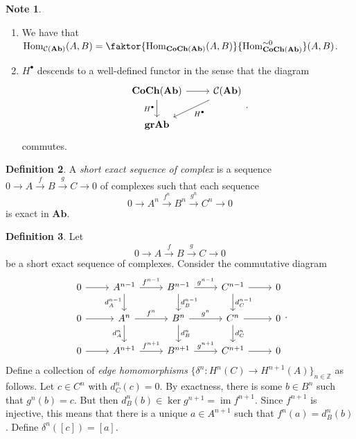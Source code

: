 \documentclass[10pt,letterpaper,cm]{nupset}
\theoremstyle{definition}
\newtheorem{definition}{Definition}[subsection]
\newtheorem{note}[definition]{Note}
\theoremstyle{theorem}
\theoremstyle{remark}
\newcommand{\Z}{\mathbb Z}
\newcommand{\1}{\mathbf{1}}
\newcommand{\0}{\vec 0}
\DeclareMathOperator{\im}{im}
\DeclareMathOperator{\Hom}{Hom}
\begin{document}
\begin{note} $ $
\begin{enumerate}
\item We have that $\Hom_{\mathcal{C}(\mathbf{Ab})}(A, B) = \faktor{\Hom_{\mathbf{CoCh(Ab)}}(A, B)}{\Hom_{\mathbf{CoCh(Ab)}}^{\sim 0}}(A, B)$.
\item $H^{\bullet}$ descends to a well-defined functor in the sense that the diagram
\[
\begin{tikzcd}
 \mathbf{CoCh(Ab)} \arrow[d, "H^{\bullet}"'] \arrow[r] &  \mathcal{C}(\mathbf{Ab}) \arrow[ld, "H^{\bullet}"] \\
\mathbf{grAb}                                          &                                  
\end{tikzcd}
. \]
commutes.
\end{enumerate}
\end{note}

\begin{definition}
A \textit{short exact sequence of complex} is a sequence $0 \to A \overset{f}{\longrightarrow} B \overset{g}{\longrightarrow} C \to 0$ of complexes such that each sequence $$0 \to A^n \overset{f^n}{\longrightarrow} B^n \overset{g^n}{\longrightarrow} C^n \to 0$$ is exact in $\mathbf{Ab}$.
\end{definition}

\begin{definition}
Let $$0 \to A \overset{f}{\longrightarrow} B \overset{g}{\longrightarrow} C \to 0$$ be a short exact sequence of complexes. Consider the commutative diagram
 \[
 \begin{tikzcd}
0 \arrow[r] & A^{n-1} \arrow[r, "f^{n-1}"] \arrow[d, "d^{n-1}_A"'] & B^{n-1} \arrow[r, "g^{n-1}"] \arrow[d, "d_B^{n-1}"] & C^{n-1} \arrow[r] \arrow[d, "d_C^{n-1}"] & 0 \\
0 \arrow[r] & A^n \arrow[r, "f^n"] \arrow[d, "d_A^n"']             & B^n \arrow[r, "g^n"] \arrow[d, "d_B^n"]             & C^n \arrow[r] \arrow[d, "d_C^n"]         & 0 \\
0 \arrow[r] & A^{n+1} \arrow[r, "f^{n+1}"]                         & B^{n+1} \arrow[r, "g^{n+1}"]                        & C^{n+1} \arrow[r]                        & 0
\end{tikzcd}
 .\]
 Define a collection of \textit{edge homomorphisms} $\{\delta^n : H^n(C) \to H^{n+1}(A)\}_{n\in \Z}$ as follows. Let $c\in C^n$ with $d_C^n(c) =0$. By exactness, there is some $b\in B^n$ such that $g^n(b) =c$. But then $d_B^n(b) \in \ker{g^{n+1}} = \im{f^{n+1}}$. Since $f^{n+1}$ is injective, this means that there is a unique $a \in A^{n+1}$ such that $f^n(a) = d_B^n(b)$. Define $\delta^n([c]) = [a]$.
\end{definition}
\end{document}
